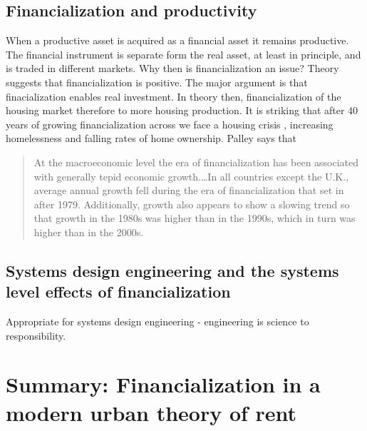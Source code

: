 \subsection{Financialization and productivity}
When  a productive asset is acquired as a financial asset it remains productive.  The financial instrument is separate form the real asset, at least in principle, and is traded in different markets. Why then is financialization an issue?  Theory suggests that financialization is positive.  The major argument is that finacialization enables real investment. In theory then, financialization of the housing market therefore  to more housing production. It is striking that after 40 years of growing financialization across we face a housing crisis , increasing homelessness and falling rates of home ownership.  Palley \cite{palleyFinancializationWhatIt2007} says that 

\begin{quotation}At the macroeconomic level the era of financialization has been associated with generally tepid economic growth.\dots  In all countries except the U.K., average annual growth fell during the era of financialization that set in after 1979. Additionally, growth also appears to show a slowing trend so that growth in the 1980s was higher than in the 1990s, which in turn was higher than in the 2000s. \end{quotation}


\subsection{Systems design engineering and the systems level effects of financialization}
Appropriate for systems design engineering
- engineering is science to responsibility.


\section{Summary: Financialization in a modern urban theory of rent}


